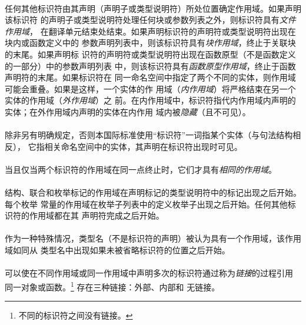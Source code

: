 \paragraph{}
任何其他标识符由其声明（声明子或类型说明符）所处位置确定作用域。如果声明该标识符
的声明子或类型说明符处理任何块或参数列表之外，则标识符具有\textit{文件作用域}，
在翻译单元结束处结束。如果声明标识符的声明符或类型说明符出现在块内或函数定义中的
参数声明列表中，则该标识符具有\textit{块作用域}，终止于关联块的末尾。如果声明标
识符的声明符或类型说明符出现在函数原型（不是函数定义的一部分）中的参数声明列表
中，则该标识符具有\textit{函数原型作用域}，终止于函数声明符的末尾。如果标识符在
同一命名空间中指定了两个不同的实体，则作用域可能会重叠。如果是这样，一个实体的作
用域（\textit{内作用域}）将严格结束在另一个实体的作用域（\textit{外作用域}）之
前。在内作用域中，标识符指代内作用域内声明的实体；在外作用域内声明的实体在内作用
域内被\textit{隐藏}（且不可见）。

\paragraph{}
除非另有明确规定，否则本国际标准使用``标识符''一词指某个实体（与句法结构相反），
它指相关命名空间中的实体，其声明在标识符出现时可见。

\paragraph{}
当且仅当两个标识符的作用域在同一点终止时，它们才具有\textit{相同的作用域}。

\paragraph{}
结构、联合和枚举标记的作用域在声明标记的类型说明符中的标记出现之后开始。每个枚举
常量的作用域在枚举子列表中的定义枚举子出现之后开始。任何其他标识符的作用域都在其
声明符完成之后开始。

\paragraph{}
作为一种特殊情况，类型名（不是标识符的声明）被认为具有一个作用域，该作用域如同从
类型名中出现如果未被省略标识符的位置之后开始。


\paragraph{}
可以使在不同作用域或同一作用域中声明多次的标识符通过称为\textit{链接}的过程引用
同一对象或函数。\footnote{不同的标识符之间没有链接。} 存在三种链接：外部、内部和
无链接。

